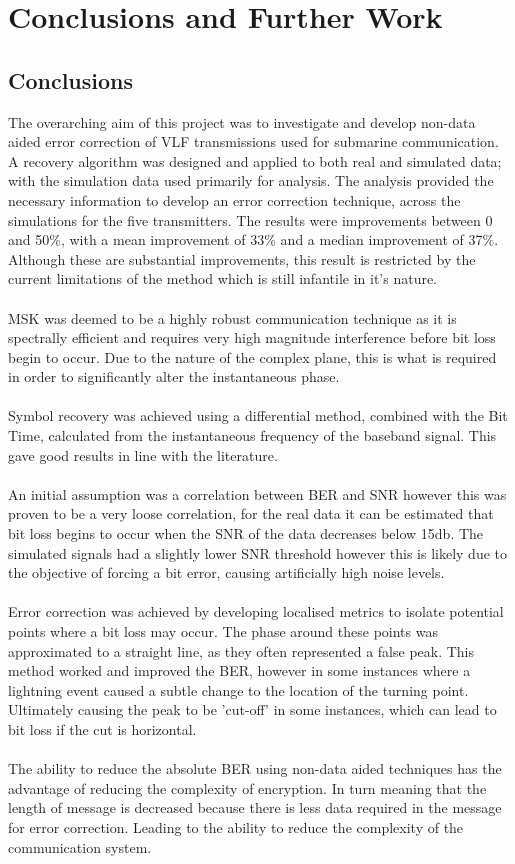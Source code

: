 \chapter{Conclusions and Further Work}
\section{Conclusions}
The overarching aim of this project was to investigate and develop non-data aided error correction of VLF transmissions used for submarine communication. A recovery algorithm was designed and applied to both real and simulated data; with the simulation data used primarily for analysis. The analysis provided the necessary information to develop an error correction technique, across the simulations for the five transmitters. The results were improvements between 0 and 50\%, with a mean improvement of 33\% and a median improvement of 37\%. Although these are substantial improvements, this result is restricted by the current limitations of the method which is still infantile in it's nature. 
\\\\
MSK was deemed to be a highly robust communication technique as it is spectrally efficient and requires very high magnitude interference before bit loss begin to occur. Due to the nature of the complex plane, this is what is required in order to significantly alter the instantaneous phase.
\\\\
Symbol recovery was achieved using a differential method, combined with the Bit Time, calculated from the instantaneous frequency of the baseband signal. This gave good results in line with the literature. 
\\\\
An initial assumption was a correlation between BER and SNR however this was proven to be a very loose correlation, for the real data it can be estimated that bit loss begins to occur when the SNR of the data decreases below 15\si{\decibel}. The simulated signals had a slightly lower SNR threshold however this is likely due to the objective of forcing a bit error, causing artificially high noise levels.
\\\\
Error correction was achieved by developing localised metrics to isolate potential points where a bit loss may occur. The phase around these points was approximated to a straight line, as they often represented a false peak. This method worked and improved the BER, however in some instances where a lightning event caused a subtle change to the location of the turning point. Ultimately causing the peak to be 'cut-off' in some instances, which can lead to bit loss if the cut is horizontal.
\\\\
The ability to reduce the absolute BER using non-data aided techniques has the advantage of reducing the complexity of encryption. In turn meaning that the length of message is decreased because there is less data required in the message for error correction. Leading to the ability to reduce the complexity of the communication system.


